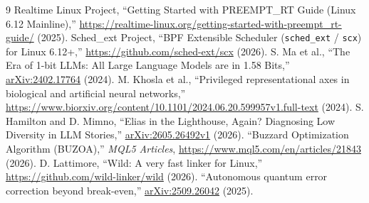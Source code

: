 \documentclass[10pt,twocolumn,letterpaper]{article}
\begin{document}
\begin{thebibliography}{9}
\footnotesize
{} Realtime Linux Project, ``Getting Started with PREEMPT\_RT Guide (Linux 6.12 Mainline),'' \url{https://realtime-linux.org/getting-started-with-preempt_rt-guide/} (2025).
 Sched\_ext Project, ``BPF Extensible Scheduler (\texttt{sched\_ext} / \texttt{scx}) for Linux 6.12+,'' \url{https://github.com/sched-ext/scx} (2026).
 S. Ma et al., ``The Era of 1-bit LLMs: All Large Language Models are in 1.58 Bits,'' \href{https://arxiv.org/abs/2402.17764}{arXiv:2402.17764} (2024).
 M. Khosla et al., ``Privileged representational axes in biological and artificial neural networks,'' \url{https://www.biorxiv.org/content/10.1101/2024.06.20.599957v1.full-text} (2024).
 S. Hamilton and D. Mimno, ``Elias in the Lighthouse, Again? Diagnosing Low Diversity in LLM Stories,'' \href{https://arxiv.org/html/2605.26492v1}{arXiv:2605.26492v1} (2026).
 ``Buzzard Optimization Algorithm (BUZOA),'' \emph{MQL5 Articles}, \url{https://www.mql5.com/en/articles/21843} (2026).
 D. Lattimore, ``Wild: A very fast linker for Linux,'' \url{https://github.com/wild-linker/wild} (2026).
 ``Autonomous quantum error correction beyond break-even,'' \href{https://arxiv.org/abs/2509.26042}{arXiv:2509.26042} (2025).
\end{thebibliography}
\end{document}
